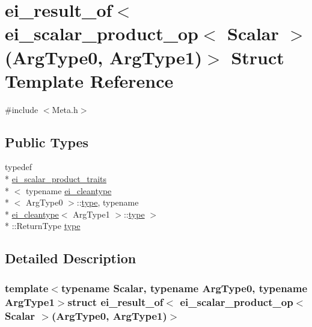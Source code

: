 \hypertarget{structei__result__of_3_01ei__scalar__product__op_3_01_scalar_01_4_07_arg_type0_00_01_arg_type1_08_4}{\section{ei\-\_\-result\-\_\-of$<$ ei\-\_\-scalar\-\_\-product\-\_\-op$<$ Scalar $>$(Arg\-Type0, Arg\-Type1)$>$ Struct Template Reference}
\label{structei__result__of_3_01ei__scalar__product__op_3_01_scalar_01_4_07_arg_type0_00_01_arg_type1_08_4}
}


{\ttfamily \#include $<$Meta.\-h$>$}

\subsection*{Public Types}
\begin{DoxyCompactItemize}
\item 
typedef \\*
\hyperlink{structei__scalar__product__traits}{ei\-\_\-scalar\-\_\-product\-\_\-traits}\\*
$<$ typename \hyperlink{structei__cleantype}{ei\-\_\-cleantype}\\*
$<$ Arg\-Type0 $>$\-::\hyperlink{structei__result__of_3_01ei__scalar__product__op_3_01_scalar_01_4_07_arg_type0_00_01_arg_type1_08_4_a3023414bdb89cee5248736ac07041ce2}{type}, typename \\*
\hyperlink{structei__cleantype}{ei\-\_\-cleantype}$<$ Arg\-Type1 $>$\-::\hyperlink{structei__result__of_3_01ei__scalar__product__op_3_01_scalar_01_4_07_arg_type0_00_01_arg_type1_08_4_a3023414bdb89cee5248736ac07041ce2}{type} $>$\\*
\-::Return\-Type \hyperlink{structei__result__of_3_01ei__scalar__product__op_3_01_scalar_01_4_07_arg_type0_00_01_arg_type1_08_4_a3023414bdb89cee5248736ac07041ce2}{type}
\end{DoxyCompactItemize}


\subsection{Detailed Description}
\subsubsection*{template$<$typename Scalar, typename Arg\-Type0, typename Arg\-Type1$>$struct ei\-\_\-result\-\_\-of$<$ ei\-\_\-scalar\-\_\-product\-\_\-op$<$ Scalar $>$(\-Arg\-Type0, Arg\-Type1)$>$}



